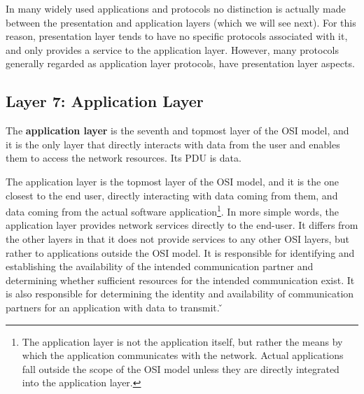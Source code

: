 In many widely used applications and protocols no distinction is actually made between the presentation and
application layers (which we will see next). For this reason, presentation layer tends to have no specific protocols
associated with it, and only provides a service to the application layer. However, many protocols generally regarded
as application layer protocols, have presentation layer aspects.

\subsection{Layer 7: Application Layer}

The \textbf{application layer} is the seventh and topmost layer of the OSI model, and it is the only layer that
directly interacts with data from the user and enables them to access the network resources. Its PDU is data.
\ed

The application layer is the topmost layer of the OSI model, and it is the one closest to the end user, directly
interacting with data coming from them, and data coming from the actual software application\footnote{The application
layer is not the application itself, but rather the means by which the application communicates with the network.
Actual applications fall outside the scope of the OSI model unless they are directly integrated into the application
layer.}. In more simple words, the application layer provides network services directly to the end-user. It differs
from the other layers in that it does not provide services to any other OSI layers, but rather to applications
outside the OSI model. It is responsible for identifying and establishing the availability of the intended
communication partner and determining whether sufficient resources for the intended communication exist. It is also
responsible for determining the identity and availability of communication partners for an application with data to
transmit. \v

